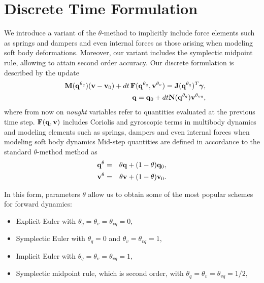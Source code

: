 \section{Discrete Time Formulation}
\label{sec:discrete_formulation}

We introduce a variant of the $\theta\text{-method}$ to implicitly include force
elements such as springs and dampers and even internal forces as those arising
when modeling soft body deformations. Moreover, our variant includes the
symplectic midpoint rule, allowing to attain second order accuracy. Our
discrete formulation is described by the update
\begin{eqnarray}
	&&\mf{M}(\mf{q}^{\theta_{q}})(\mf{v}-\mf{v}_0) + 
	dt\,\mf{F}(\mf{q}^{\theta_{q}}, \mf{v}^{\theta_v}) = \mf{J}(\mf{q}^{\theta_{q}})^T\mf{\bgamma},
	\label{eq:v_update}\\
	&&\mf{q} = \mf{q}_0 + dt\mf{N}(\mf{q}^{\theta_{q}})\mf{v}^{\theta_{vq}},
	\label{eq:q_update}
\end{eqnarray}
where from now on \textit{nought} variables refer to quantities evaluated at the
previous time step. ${\mathbf{F}}({\mathbf{q}}, {\mathbf{v}})$ includes Coriolis and gyroscopic
terms in multibody dynamics and modeling elements such as springs, dampers and
even internal forces when modeling soft body dynamics 
Mid-step quantities are defined in accordance to the standard
$\theta\text{-method}$ method as
\begin{eqnarray}
	{\mathbf{q}}^{\theta} &=& \theta{\mathbf{q}} + (1-\theta){\mathbf{q}}_0,\\
	{\mathbf{v}}^{\theta} &=& \theta{\mathbf{v}} + (1-\theta){\mathbf{v}}_0.
\end{eqnarray}

In this form, parameters $\theta$ allow us to obtain some of the most popular
schemes for forward dynamics:
\begin{itemize}
	\item Explicit Euler with $\theta_q=\theta_{v}=\theta_{vq} = 0$,
	\item Symplectic Euler with $\theta_{q} = 0$ and $\theta_v = \theta_{vq}=1$,
	\item Implicit Euler with $\theta_{q} = \theta_v = \theta_{vq}= 1$,
	\item Symplectic midpoint rule, which is second order, with $\theta_{q} =
	\theta_v = \theta_{vq}= 1/2$,
\end{itemize}

